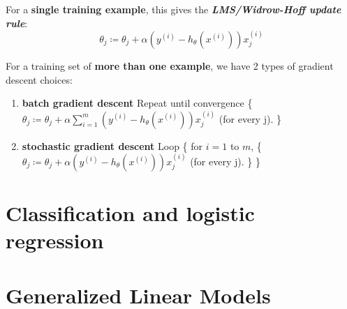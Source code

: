\documentclass{article}
\begin{document}
For a \textbf{single training example}, this gives the \emph{\textbf{LMS/Widrow-Hoff update rule}}:
\begin{equation*}
\theta_j\coloneqq\theta_j+\alpha(y^{(i)}-h_\theta(x^{(i)}))x_j^{(i)}
\end{equation*}

For a training set of \textbf{more than one example}, we have 2 types of gradient descent choices:
\begin{enumerate}
    \item \textbf{batch gradient descent}
        \newline Repeat until convergence \{
        \newline $\theta_j\coloneqq\theta_j+\alpha\sum\limits_{i=1}^m(y^{(i)}-h_\theta(x^{(i)}))x_j^{(i)}$ (for every j).
        \newline \}
    \item \textbf{stochastic gradient descent}
        \newline Loop \{
        \newline \hspace*{1cm} for $i=1$ to $m$, \{
        \newline \hspace*{1cm} \hspace{1cm}$\theta_j\coloneqq\theta_j+\alpha(y^{(i)}-h_\theta(x^{(i)}))x_j^{(i)}$ (for every j).
        \newline \hspace*{1cm}\}
        \newline \}
\end{enumerate}

\section{Classification and logistic regression}

\section{Generalized Linear Models}
\end{document}
